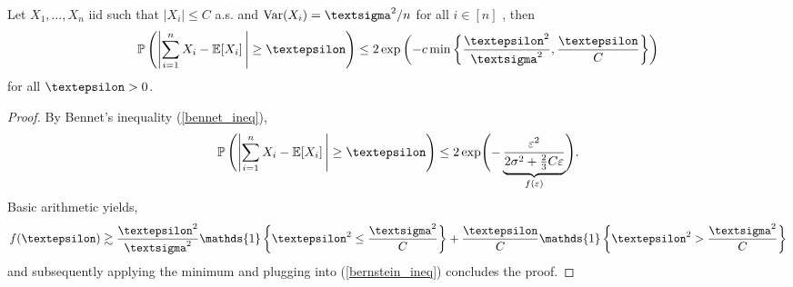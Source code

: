 \documentclass[openany]{book}
\begin{document}
\begin{corollary}\label{bernstein_ineq}
Let $X_1,\dots,X_n$ iid such that $\vert X_i\vert \leq C$ a.s. and $\mathrm{Var}(X_i)=\gsigma^2/n$ for all $i\in [n]$ , then
\begin{equation*}
    \mathbb P\left(\left\vert \sum_{i=1}^nX_i-\mathbb E[X_i]\,\right\vert\geq \gepsilon\right)\leq 2 \exp\left(-c\min\left\{\frac{\gepsilon^2}{\gsigma^2}, \frac{\gepsilon}{C}\right\}\right)
\end{equation*}
for all $\gepsilon>0$.
\begin{proof}
    By Bennet's inequality (\ref{bennet_ineq}), 
    \begin{equation*}
        \mathbb P\left(\left\vert \sum_{i=1}^n X_i-\mathbb E[X_i]\,\right\vert \geq \gepsilon\right)
\leq
2\exp\Biggl(
  -\underbrace{\frac{\varepsilon^2}{2\sigma^2+\tfrac{2}{3}C\varepsilon}}_{f(\varepsilon)}
\Biggr).
    \end{equation*}
    Basic arithmetic yields,
    \begin{equation*}
        f(\gepsilon)\gtrsim\frac{\gepsilon^2}{\gsigma^2}\mathds{1}\left\{\gepsilon^2\leq \frac{\gsigma^2}{C}\right\}+\frac{\gepsilon}{C}\mathds{1}\left\{\gepsilon^2> \frac{\gsigma^2}{C}\right\}
    \end{equation*}
    and subsequently applying the minimum and plugging into (\ref{bernstein_ineq}) concludes the proof.
\end{proof}
\end{corollary}
\end{document}
